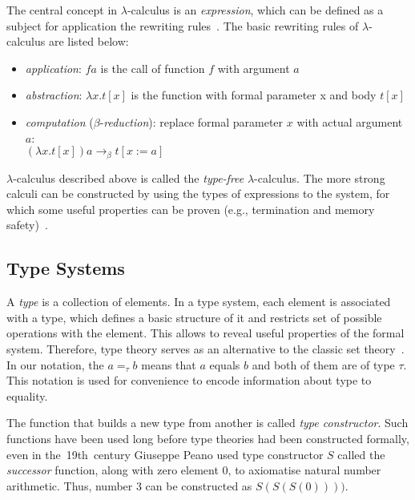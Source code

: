 \documentclass[article]{aaltoseries}
\begin{document}
The central concept in $\lambda$-calculus is an \textit{expression}, which can be defined as a subject for application the rewriting rules~\cite{Bar88}. The basic rewriting rules of $\lambda$-calculus are listed below:

\begin{itemize}
\itemsep0em
	\item \textit{application}:
	$f a$ is the call of function $f$ with argument $a$
	
	\item \textit{abstraction}:
	$\lambda x.t[x]$ is the function with formal parameter x and body $t[x]$
	
	\item \textit{computation} ($\beta$-\textit{reduction}): replace formal parameter $x$ with actual argument $a$: \\
	$(\lambda x.t[x]) a \rightarrow_{\beta} t[x:=a]$
\end{itemize}

$\lambda$-calculus described above is called the \textit{type-free} $\lambda$-calculus. The more strong calculi can be constructed by using the types of expressions to the system, for which some useful properties can be proven (e.g., termination and memory safety)~\cite{Bar13}.

\subsection{Type Systems}

A \textit{type} is a collection of elements. In a type system, each element is associated with a type, which defines a basic structure of it and restricts set of possible operations with the element. This allows to reveal useful properties of the formal system. Therefore, type theory serves as an alternative to the classic set theory~\cite{Tho91}.
In our notation, the $a =_{\tau} b$ means that $a$ equals $b$ and both of them are of type $\tau$. This notation is used for convenience to encode information about type to equality.

The function that builds a new type from another is called \textit{type constructor}. Such functions have been used long before type theories had been constructed formally, even in the~19th~century Giuseppe Peano used type constructor $S$ called the \textit{successor} function, along with zero element 0, to axiomatise natural number arithmetic. Thus, number 3 can be constructed as $S(S(S(0))))$.
\end{document}
